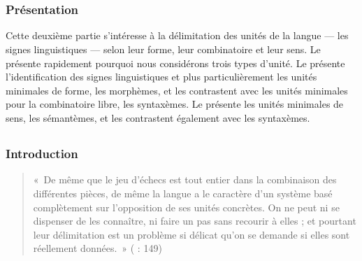 \part{}\label{sec:2}

\section*{Présentation}

Cette deuxième partie s’intéresse à la délimitation des unités de la langue — les signes linguistiques — selon leur forme, leur combinatoire et leur sens. Le  présente rapidement pourquoi nous considérons trois types d’unité. Le  présente l’identification des signes linguistiques et plus particulièrement les unités minimales de forme, les morphèmes, et les contrastent avec les unités minimales pour la combinatoire libre, les syntaxèmes. Le  présente les unités minimales de sens, les sémantèmes, et les contrastent également avec les syntaxèmes.

\chapter{}\label{sec:2.1}

\section{Introduction}\label{sec:2.1.0}

\begin{quote}
    «~De même que le jeu d’échecs est tout entier dans la combinaison des différentes pièces, de même la langue a le caractère d’un système basé complètement sur l’opposition de ses unités concrètes. On ne peut ni se dispenser de les connaître, ni faire un pas sans recourir à elles ; et pourtant leur délimitation est un problème si délicat qu’on se demande si elles sont réellement données.~» (\citealt{Saussure1916} : 149)
\end{quote}

